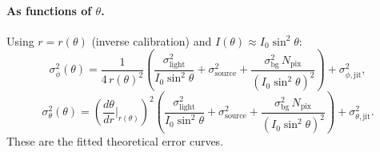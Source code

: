 \documentclass[11pt]{article}
\begin{document}
\paragraph{As functions of \(\theta\).}
Using \(r=r(\theta)\) (inverse calibration) and \(I(\theta)\approx I_0\sin^2\theta\):
\[
\sigma_\phi^2(\theta)=
\frac{1}{4\,r(\theta)^2}
\left(
\frac{\sigma_{\text{light}}^2}{I_0\sin^2\theta}
+
\sigma_{\text{source}}^2
+
\frac{\sigma_{\text{bg}}^2\,N_{\text{pix}}}{\left(I_0\sin^2\theta\right)^2}
\right)
+
\sigma_{\phi,\text{jit}}^2,
\]
\[
\sigma_\theta^2(\theta)=
\left(\frac{d\theta}{dr}\Big|_{r(\theta)}\right)^2
\left(
\frac{\sigma_{\text{light}}^2}{I_0\sin^2\theta}
+
\sigma_{\text{source}}^2
+
\frac{\sigma_{\text{bg}}^2\,N_{\text{pix}}}{\left(I_0\sin^2\theta\right)^2}
\right)
+
\sigma_{\theta,\text{jit}}^2.
\]
These are the fitted theoretical error curves.
\end{document}
